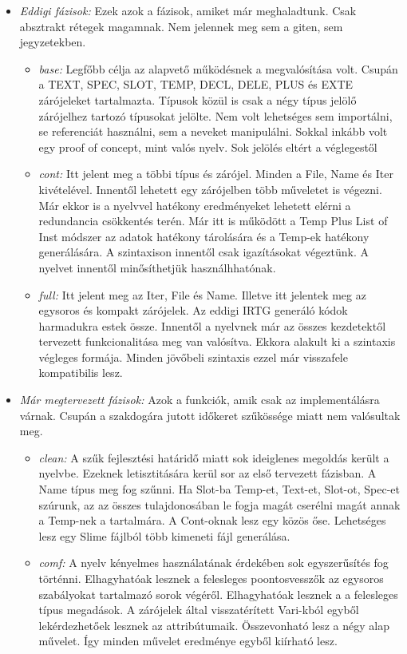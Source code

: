 {\begin{itemize}
\item \emph{Eddigi fázisok:}
Ezek azok a fázisok, amiket már meghaladtunk.
Csak absztrakt rétegek magamnak.
Nem jelennek meg sem a giten, sem jegyzetekben.
\begin{itemize}
\item \emph{base:}
Legfőbb célja az alapvető működésnek a megvalósítása volt. 
Csupán a TEXT, SPEC, SLOT, TEMP, DECL, DELE, PLUS és EXTE zárójeleket tartalmazta.
Típusok közül is csak a négy típus jelölő zárójelhez tartozó típusokat jelölte.
Nem volt lehetséges sem importálni, se referenciát használni, sem a neveket manipulálni.
Sokkal inkább volt egy proof of concept, mint valós nyelv. 
Sok jelölés eltért a véglegestől

\item \emph{cont:}
Itt jelent meg a többi típus és zárójel.
Minden a File, Name és Iter kivételével.
Innentől lehetett egy zárójelben több műveletet is végezni.
Már ekkor is a nyelvvel hatékony eredményeket lehetett elérni a redundancia csökkentés terén.
Már itt is működött a Temp Plus List of Inst módszer az adatok hatékony tárolására és a Temp-ek
hatékony generálására.
A szintaxison innentől csak igazításokat végeztünk.
A nyelvet innentől minősíthetjük használhhatónak.
\item \emph{full:}
Itt jelent meg az Iter, File és Name.
Illetve itt jelentek meg az egysoros és kompakt zárójelek.
Az eddigi IRTG generáló kódok harmadukra estek össze.
Innentől a nyelvnek már az összes kezdetektől tervezett funkcionalitása meg van valósítva.
Ekkora alakult ki a szintaxis végleges formája.
Minden jövőbeli szintaxis ezzel már visszafele kompatibilis lesz.
\end{itemize}

\item \emph{Már megtervezett fázisok:}
Azok a funkciók, amik csak az implementálásra várnak.
Csupán a szakdogára jutott időkeret szűkössége miatt nem valósultak meg.
\begin{itemize}
\item \emph{clean:}
A szűk fejlesztési határidő miatt sok ideiglenes megoldás került a nyelvbe.
Ezeknek letisztitására kerül sor az első tervezett fázisban.
A Name típus meg fog szűnni.
Ha Slot-ba Temp-et, Text-et, Slot-ot, Spec-et szúrunk, az az összes tulajdonosában le fogja magát cserélni magát annak a Temp-nek a tartalmára.
A Cont-oknak lesz egy közös őse. 
Lehetséges lesz egy Slime fájlból több kimeneti fájl generálása.
\item \emph{comf:}
A nyelv kényelmes használatának érdekében sok egyszerűsítés fog történni.
Elhagyhatóak lesznek a felesleges poontosvesszők az egysoros szabályokat tartalmazó sorok végéről.
Elhagyhatóak lesznek a a felesleges típus megadások.
A zárójelek által visszatérített Vari-kból egyből lekérdezhetőek lesznek az attribútumaik. 
Összevonható lesz a négy alap művelet.
Így minden művelet eredménye egyből kiírható lesz.


\end{itemize}
\end{itemize}}
